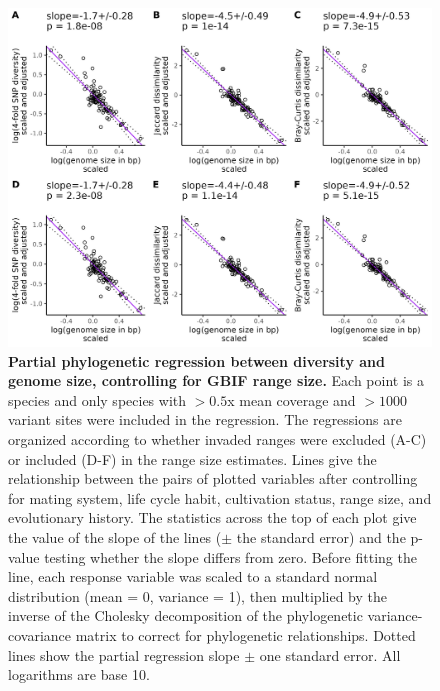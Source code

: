 \documentclass[12pt]{article}
\begin{document}
\begin{figure}[H]
    \centering
    \includegraphics[width=\textwidth]{figures/appendix_d/gbif_area_vs_genome_size_corrected_2024-12-12.jpg}
    \caption{\textbf{Partial phylogenetic regression between diversity and genome size, controlling for GBIF range size.} Each point is a species and only species with $>0.5$x mean coverage and $>1000$ variant sites were included in the regression. The regressions are organized according to whether invaded ranges were excluded (A-C) or included (D-F) in the range size estimates. Lines give the relationship between the pairs of plotted variables after controlling for mating system, life cycle habit, cultivation status, range size, and evolutionary history. The statistics across the top of each plot give the value of the slope of the lines ($\pm$ the standard error) and the p-value testing whether the slope differs from zero. Before fitting the line, each response variable was scaled to a standard normal distribution (mean = 0, variance = 1), then multiplied by the inverse of the Cholesky decomposition of the phylogenetic variance-covariance matrix to correct for phylogenetic relationships. Dotted lines show the partial regression slope $\pm$ one standard error. All logarithms are base 10.}
\end{figure}
\end{document}
